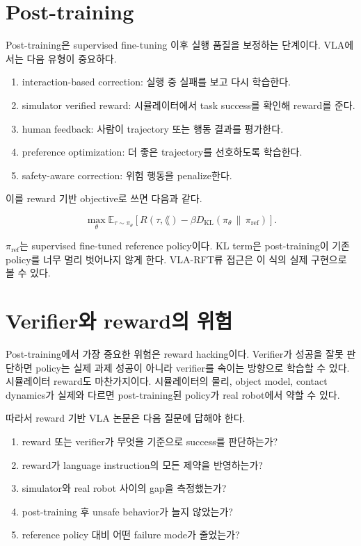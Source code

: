 \section{Post-training}

Post-training은 supervised fine-tuning 이후 실행 품질을 보정하는 단계이다. VLA에서는 다음 유형이 중요하다.

\begin{enumerate}
  \item interaction-based correction: 실행 중 실패를 보고 다시 학습한다.
  \item simulator verified reward: 시뮬레이터에서 task success를 확인해 reward를 준다.
  \item human feedback: 사람이 trajectory 또는 행동 결과를 평가한다.
  \item preference optimization: 더 좋은 trajectory를 선호하도록 학습한다.
  \item safety-aware correction: 위험 행동을 penalize한다.
\end{enumerate}

이를 reward 기반 objective로 쓰면 다음과 같다.

\begin{equation}
  \max_\theta
  \mathbb{E}_{\tau \sim \pi_\theta}
  \left[
  R(\tau,\lang)
  -
  \beta
  D_{\mathrm{KL}}(\pi_\theta \,\|\, \pi_{\mathrm{ref}})
  \right].
  \label{eq:rft_objective}
\end{equation}

$\pi_{\mathrm{ref}}$는 supervised fine-tuned reference policy이다. KL term은 post-training이 기존 policy를 너무 멀리 벗어나지 않게 한다. VLA-RFT류 접근은 이 식의 실제 구현으로 볼 수 있다.

\section{Verifier와 reward의 위험}

Post-training에서 가장 중요한 위험은 reward hacking이다. Verifier가 성공을 잘못 판단하면 policy는 실제 과제 성공이 아니라 verifier를 속이는 방향으로 학습할 수 있다. 시뮬레이터 reward도 마찬가지이다. 시뮬레이터의 물리, object model, contact dynamics가 실제와 다르면 post-training된 policy가 real robot에서 약할 수 있다.

따라서 reward 기반 VLA 논문은 다음 질문에 답해야 한다.

\begin{enumerate}
  \item reward 또는 verifier가 무엇을 기준으로 success를 판단하는가?
  \item reward가 language instruction의 모든 제약을 반영하는가?
  \item simulator와 real robot 사이의 gap을 측정했는가?
  \item post-training 후 unsafe behavior가 늘지 않았는가?
  \item reference policy 대비 어떤 failure mode가 줄었는가?
\end{enumerate}

